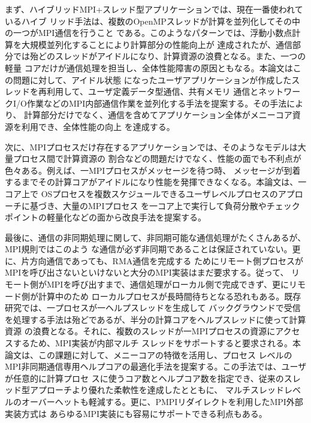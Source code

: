 まず、ハイブリッドMPI+スレッド型アプリケーションでは、現在一番使われているハイブ
リッド手法は、複数のOpenMPスレッドが計算を並列化してその中の一つがMPI通信を行うこと
である。このようなパターンでは、浮動小数点計算を大規模並列化することにより計算部分の性能向上が
達成されたが、通信部分では殆どのスレッドがアイドルになり、計算資源の浪費となる。また、一つの軽量
コアだけが通信処理を担当し、全体性能障害の原因ともなる。本論文はこの問題に対して、アイドル状態
になったユーザアプリケーションが作成したスレッドを再利用して、ユーザ定義データ型通信、共有メモリ
通信とネットワークI/O作業などのMPI内部通信作業を並列化する手法を提案する。その手法により、
計算部分だけでなく、通信を含めてアプリケーション全体がメニーコア資源を利用でき、全体性能の向上
を達成する。

次に、MPIプロセスだけ存在するアプリケーションでは、そのようなモデルは大量プロセス間で計算資源の
割合などの問題だけでなく、性能の面でも不利点が色々ある。例えば、一MPIプロセスがメッセージを待つ時、
メッセージが到着するまでその計算コアがアイドルになり性能を発揮できなくなる。本論文は、一コア上で
OSプロセスを複数スケジュールできるユーザレベルプロセスのアプローチに基づき、大量のMPIプロセス
を一コア上で実行して負荷分散やチェックポイントの軽量化などの面から改良手法を提案する。

最後に、通信の非同期処理に関して、非同期可能な通信処理がたくさんあるが、MPI規則ではこのよう
な通信が必ず非同期であることは保証されていない。更に、片方向通信であっても、RMA通信を完成する
ためにリモート側プロセスがMPIを呼び出さないといけないと大分のMPI実装はまだ要求する。従って、
リモート側がMPIを呼び出すまで、通信処理がローカル側で完成できず、更にリモード側が計算中のため
ローカルプロセスが長時間待ちとなる恐れもある。既存研究では、一プロセスが一ヘルプスレッドを生成して
バックグラウンドで受信を処理する手法は殆どであるが、半分の計算コアをヘルプスレッドに使って計算資源
の浪費となる。それに、複数のスレッドが一MPIプロセスの資源にアクセスするため、MPI実装が内部マルチ
スレッドをサポートすると要求される。本論文は、この課題に対して、メニーコアの特徴を活用し、プロセス
レベルのMPI非同期通信専用ヘルプコアの最適化手法を提案する。この手法では、ユーザが任意的に計算プロセ
スに使うコア数とヘルプコア数を指定でき、従来のスレッド型アプローチより優れた柔軟性を達成したとともに、
マルチスレッドレベルのオーバーヘットも軽減する。更に、PMPIリダイレクトを利用したMPI外部実装方式は
あらゆるMPI実装にも容易にサポートできる利点もある。

